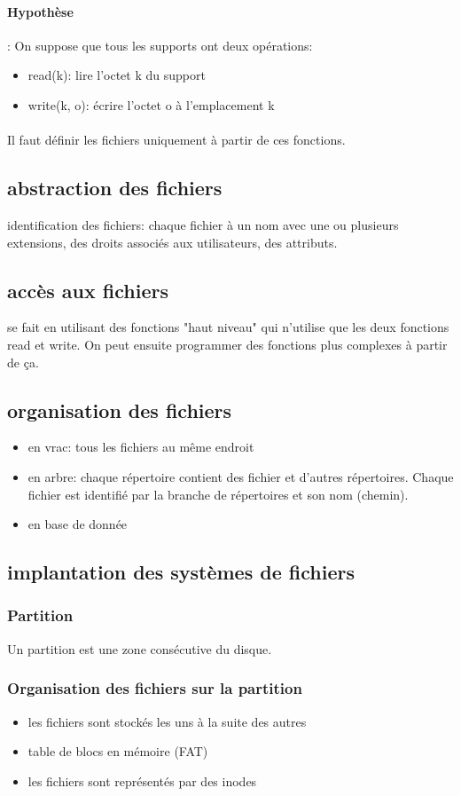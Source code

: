 \documentclass[10pt,a4paper]{article}
\begin{document}
		\paragraph{Hypothèse}: On suppose que tous les supports ont deux opérations:\begin{itemize}
			\item read(k): lire l'octet k du support
			\item write(k, o): écrire l'octet o à l'emplacement k
		\end{itemize}
		\paragraph{} Il faut définir les fichiers uniquement à partir de ces fonctions.
		\subsection{abstraction des fichiers}
			identification des fichiers: chaque fichier à un nom avec une ou plusieurs extensions, des droits associés aux utilisateurs, des attributs.
		\subsection{accès aux fichiers}
			se fait en utilisant des fonctions "haut niveau" qui n'utilise que les deux fonctions read et write. On peut ensuite programmer des fonctions plus complexes à partir de ça.
		\subsection{organisation des fichiers}
			\begin{itemize}
				\item en vrac: tous les fichiers au même endroit
				\item en arbre: chaque répertoire contient des fichier et d'autres répertoires. Chaque fichier est identifié par la branche de répertoires et son nom (chemin).
				\item en base de donnée
			\end{itemize}
		\subsection{implantation des systèmes de fichiers}
			\subsubsection{Partition}		
				Un partition est une zone consécutive du disque.
			\subsubsection{Organisation des fichiers sur la partition}
				\begin{itemize}
					\item les fichiers sont stockés les uns à la suite des autres
					\item table de blocs en mémoire (FAT)
					\item les fichiers sont représentés par des inodes
				\end{itemize}
		
\end{document}
